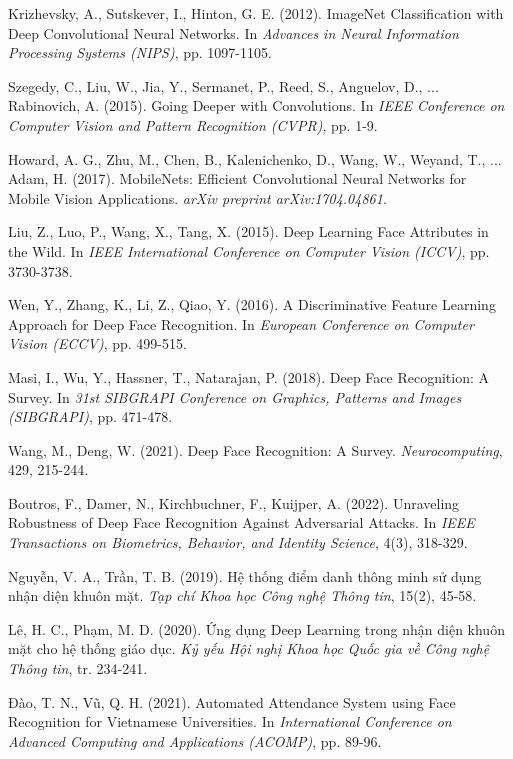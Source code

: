 \documentclass[12pt,a4paper]{report}
\begin{document}
\begin{thebibliography}{50}
Krizhevsky, A., Sutskever, I., Hinton, G. E. (2012). ImageNet Classification with Deep Convolutional Neural Networks. In \textit{Advances in Neural Information Processing Systems (NIPS)}, pp. 1097-1105.

Szegedy, C., Liu, W., Jia, Y., Sermanet, P., Reed, S., Anguelov, D., ... Rabinovich, A. (2015). Going Deeper with Convolutions. In \textit{IEEE Conference on Computer Vision and Pattern Recognition (CVPR)}, pp. 1-9.

Howard, A. G., Zhu, M., Chen, B., Kalenichenko, D., Wang, W., Weyand, T., ... Adam, H. (2017). MobileNets: Efficient Convolutional Neural Networks for Mobile Vision Applications. \textit{arXiv preprint arXiv:1704.04861}.

Liu, Z., Luo, P., Wang, X., Tang, X. (2015). Deep Learning Face Attributes in the Wild. In \textit{IEEE International Conference on Computer Vision (ICCV)}, pp. 3730-3738.

Wen, Y., Zhang, K., Li, Z., Qiao, Y. (2016). A Discriminative Feature Learning Approach for Deep Face Recognition. In \textit{European Conference on Computer Vision (ECCV)}, pp. 499-515.

Masi, I., Wu, Y., Hassner, T., Natarajan, P. (2018). Deep Face Recognition: A Survey. In \textit{31st SIBGRAPI Conference on Graphics, Patterns and Images (SIBGRAPI)}, pp. 471-478.

Wang, M., Deng, W. (2021). Deep Face Recognition: A Survey. \textit{Neurocomputing}, 429, 215-244.

Boutros, F., Damer, N., Kirchbuchner, F., Kuijper, A. (2022). Unraveling Robustness of Deep Face Recognition Against Adversarial Attacks. In \textit{IEEE Transactions on Biometrics, Behavior, and Identity Science}, 4(3), 318-329.

Nguyễn, V. A., Trần, T. B. (2019). Hệ thống điểm danh thông minh sử dụng nhận diện khuôn mặt. \textit{Tạp chí Khoa học Công nghệ Thông tin}, 15(2), 45-58.

Lê, H. C., Phạm, M. D. (2020). Ứng dụng Deep Learning trong nhận diện khuôn mặt cho hệ thống giáo dục. \textit{Kỷ yếu Hội nghị Khoa học Quốc gia về Công nghệ Thông tin}, tr. 234-241.

Đào, T. N., Vũ, Q. H. (2021). Automated Attendance System using Face Recognition for Vietnamese Universities. In \textit{International Conference on Advanced Computing and Applications (ACOMP)}, pp. 89-96.


\end{thebibliography}
\end{document}
